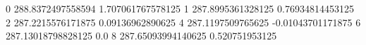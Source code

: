 0 288.8372497558594 1.707061767578125
1 287.8995361328125 0.76934814453125
2 287.2215576171875 0.09136962890625
4 287.1197509765625 -0.01043701171875
6 287.13018798828125 0.0
8 287.65093994140625 0.520751953125
